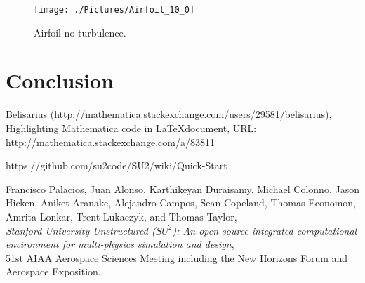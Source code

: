 \documentclass[10pt, titlepage]{article}
\begin{document}
\begin{figure}[ht]
\centering
\texttt{[image: ./Pictures/Airfoil\_10\_0]}
\caption[Airfoil, No Turbulence]{Airfoil no turbulence.}
\label{airfoil}
\end{figure}

\section{Conclusion}

\lipsum[5-7]

\newpage
\begin{thebibliography}{9}


Belisarius (http://mathematica.stackexchange.com/users/29581/belisarius), Highlighting Mathematica code in \LaTeX document, URL: http://mathematica.stackexchange.com/a/83811

https://github.com/su2code/SU2/wiki/Quick-Start

Francisco Palacios, Juan Alonso, Karthikeyan Duraisamy, Michael Colonno, Jason Hicken, Aniket Aranake, Alejandro Campos, Sean Copeland, Thomas Economon, Amrita Lonkar, Trent Lukaczyk, and Thomas Taylor, \\
\emph{Stanford University Unstructured ($SU^2$): An open-source integrated computational environment for multi-physics simulation and design}, \\
51st AIAA Aerospace Sciences Meeting including the New Horizons Forum and Aerospace Exposition. 



\end{thebibliography}
\end{document}

